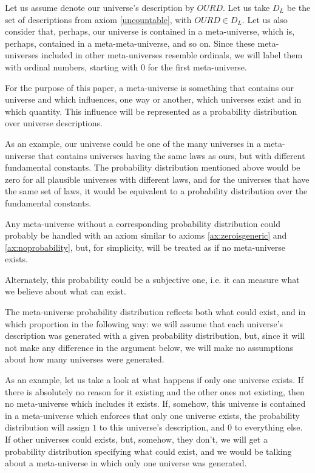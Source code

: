 \documentclass[a4paper
,draft
]{article}
\def\descriptions{D_L}
\def\our_description{OURD}
\begin{document}
Let us assume denote our universe's description by
$\our_description$. Let us take $\descriptions$ be the set of descriptions from
axiom \ref{uncountable}, with $\our_description\in\descriptions$.
Let us also consider that, perhaps, our universe is contained
in a meta-universe, which is, perhaps, contained in
a meta-meta-universe, and so on. Since these meta-universes included in other
meta-universes resemble ordinals, we will label them with ordinal numbers,
starting with $0$ for the first meta-universe.

For the purpose of this paper, a meta-universe is something that contains our
universe and which influences, one way or another, which universes exist and
in which quantity. This influence will be represented as a probability
distribution over universe descriptions.

As an example, our universe could be one of the many universes in a
meta-universe that contains universes having the same laws as ours, but with
different fundamental constants.
The probability distribution mentioned above would be zero for all
plausible universes with different laws, and for the universes that have
the same set of laws, it would be equivalent to a
probability distribution over the fundamental constants.

Any meta-universe without a corresponding probability distribution could
probably be handled with an axiom similar to axioms \ref{ax:zeroisgeneric}
and \ref{ax:noprobability}, but, for simplicity, will be
treated as if no meta-universe exists.

Alternately, this probability could be a subjective one, i.e. it can measure
what we believe about what can exist.

The meta-universe probability distribution reflects both what could exist, and
in which proportion in the following way: we will assume that each universe's
description was generated with a given probability distribution, but, since
it will not make any difference in the argument below, we will make no
assumptions about how many universes were generated.

As an example, let us take a look at what happens if only one universe exists.
If there is absolutely no reason
for it existing and the other ones not existing, then no meta-universe which
includes it exists.
If, somehow, this universe is contained in a meta-universe which
enforces that only one universe exists, the probability distribution will
assign $1$ to this universe's description, and $0$ to everything else.
If other universes could exists, but, somehow, they don't, we will get a
probability distribution specifying what could exist, and we would be talking
about a meta-universe in which only one universe was generated.
\end{document}
